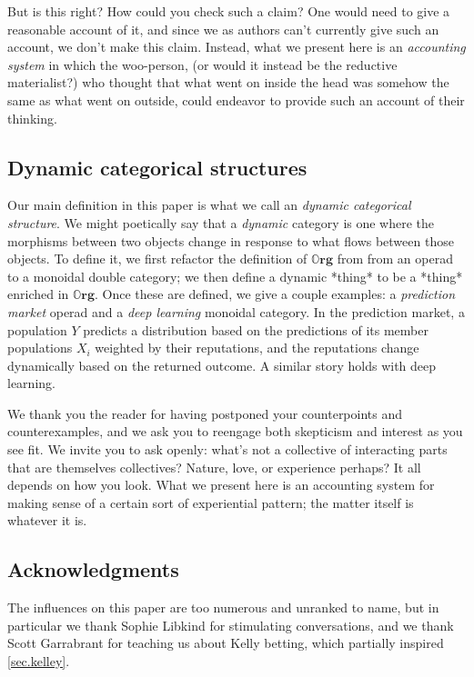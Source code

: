 \documentclass{eptcs}
\theoremstyle{definition}
\theoremstyle{plain}
\newcommand{\Cat}[1]{\textbf{#1}}%
\newcommand{\0}{\textsf{0}}
\newcommand{\1}{\tn{\textsf{1}}}
\newcommand{\org}{{\mathbb{O}\Cat{rg}}}
\begin{document}
But is this right? How could you check such a claim? One would need to give a reasonable account of it, and since we as authors can't currently give such an account, we don't make this claim. Instead, what we present here is an \emph{accounting system} in which the woo-person, (or would it instead be the reductive materialist?) who thought that what went on inside the head was somehow the same as what went on outside, could endeavor to provide such an account of their thinking.

\subsection{Dynamic categorical structures}

Our main definition in this paper is what we call an \emph{dynamic categorical structure}. We might poetically say that a \emph{dynamic} category is one where the morphisms between two objects change in response to what flows between those objects. To define it, we first refactor the definition of $\org$ from \cite{spivak2021learners} from an operad to a monoidal double category; we then define a dynamic *thing* to be a *thing* enriched in $\org$. Once these are defined, we give a couple examples: a \emph{prediction market} operad and a \emph{deep learning} monoidal category. In the prediction market, a population $Y$ predicts a distribution based on the predictions of its member populations $X_i$ weighted by their reputations, and the reputations change dynamically based on the returned outcome. A similar story holds with deep learning.

We thank you the reader for having postponed your counterpoints and counterexamples, and we ask you to reengage both skepticism and interest as you see fit. We invite you to ask openly: what's not a collective of interacting parts that are themselves collectives? Nature, love, or experience perhaps? It all depends on how you look. What we present here is an accounting system for making sense of a certain sort of experiential pattern; the matter itself is whatever it is.

\subsection{Acknowledgments}

The influences on this paper are too numerous and unranked to name, but in particular we thank Sophie Libkind for stimulating conversations, and we thank Scott Garrabrant for teaching us about Kelly betting, which partially inspired \cref{sec.kelley}.
\end{document}
